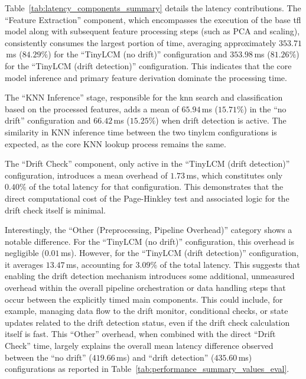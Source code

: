 Table~\ref{tab:latency_components_summary} details the latency contributions. The ``Feature Extraction'' component, which encompasses the execution of the base \gls{tfl} model along with subsequent feature processing steps (such as PCA and scaling), consistently consumes the largest portion of time, averaging approximately $353.71$\,\si{\milli\second} ($84.29\%$) for the ``TinyLCM (no drift)'' configuration and $353.98$\,\si{\milli\second} ($81.26\%$) for the ``TinyLCM (drift detection)'' configuration. This indicates that the core model inference and primary feature derivation dominate the processing time.

The ``KNN Inference'' stage, responsible for the \gls{knn} search and classification based on the processed features, adds a mean of $65.94$\,\si{\milli\second} ($15.71\%$) in the ``no drift'' configuration and $66.42$\,\si{\milli\second} ($15.25\%$) when drift detection is active. The similarity in KNN inference time between the two \gls{tinylcm} configurations is expected, as the core KNN lookup process remains the same.

The ``Drift Check'' component, only active in the ``TinyLCM (drift detection)'' configuration, introduces a mean overhead of $1.73$\,\si{\milli\second}, which constitutes only $0.40\%$ of the total latency for that configuration. This demonstrates that the direct computational cost of the Page-Hinkley test and associated logic for the drift check itself is minimal.

Interestingly, the ``Other (Preprocessing, Pipeline Overhead)'' category shows a notable difference. For the ``TinyLCM (no drift)'' configuration, this overhead is negligible ($0.01$\,\si{\milli\second}). However, for the ``TinyLCM (drift detection)'' configuration, it averages $13.47$\,\si{\milli\second}, accounting for $3.09\%$ of the total latency. This suggests that enabling the drift detection mechanism introduces some additional, unmeasured overhead within the overall pipeline orchestration or data handling steps that occur between the explicitly timed main components. This could include, for example, managing data flow to the drift monitor, conditional checks, or state updates related to the drift detection status, even if the drift check calculation itself is fast. This ``Other'' overhead, when combined with the direct ``Drift Check'' time, largely explains the overall mean latency difference observed between the ``no drift'' ($419.66$\,\si{\milli\second}) and ``drift detection'' ($435.60$\,\si{\milli\second}) configurations as reported in Table~\ref{tab:performance_summary_values_eval}.

